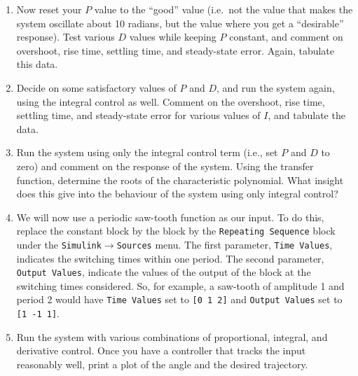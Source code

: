 \begin{enumerate}
    \item\label{step:4} Now reset your \(P\) value to the ``good'' value (i.e.\ not the value that makes
          the system oscillate about 10 radians, but the value where you get a ``desirable'' response). Test various \(D\) values while keeping \(P\) constant, and comment on overshoot, rise time, settling time, and steady-state error.
          Again, tabulate this data.

    \item\label{step:5} Decide on some satisfactory values of \(P\) and \(D\), and run the
          system again, using the integral control as well.  Comment on the overshoot,
          rise time, settling time, and steady-state error for various values of
          \(I\), and tabulate the data.

    \item Run the system using only the integral control term (i.e., set \(P\) and
          \(D\) to zero) and comment on the response of the system.  Using the
          transfer function, determine the roots of the characteristic polynomial.
          What insight does this give into the behaviour of the system using only
          integral control?

    \item We will now use a periodic saw-tooth function as our input.  To do
          this, replace the constant block by the block by the
          \verb|Repeating Sequence| block under the
          \verb|Simulink|\(\rightarrow \)\verb|Sources| menu.  The first parameter,
          \verb|Time Values|, indicates the switching times within one period.  The
          second parameter, \verb|Output Values|, indicate the values of the output of
          the block at the switching times considered.  So, for example, a saw-tooth of
          amplitude 1 and period 2 would have \verb|Time Values| set to \verb|[0 1 2]|
          and \verb|Output Values| set to \verb|[1 -1 1]|.

    \item Run the system with various combinations of proportional, integral, and
          derivative control.  Once you have a controller that tracks the input
          reasonably well, print a plot of the angle and the desired trajectory.


\end{enumerate}
